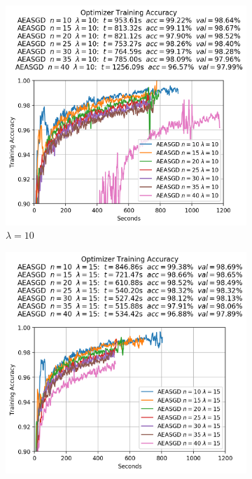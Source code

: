 \begin{figure}
  \centering
  \begin{subfigure}{.3\textwidth}
    \centering
    \includegraphics[width=\linewidth]{resources/images/aeasgd_experiments_lambda_10}
    \caption{$\lambda = 10$}
  \end{subfigure}
  \begin{subfigure}{.3\textwidth}
    \centering
    \includegraphics[width=\linewidth]{resources/images/aeasgd_experiments_lambda_15}

\end{subfigure}
\end{figure}
